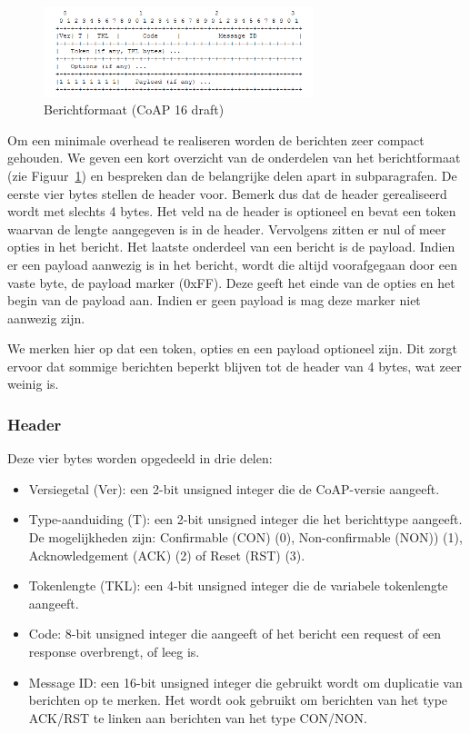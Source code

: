 \begin{figure}
\vspace{-20pt}
\includegraphics[width=0.7\textwidth]{fig/CoAPMessageFormat}
\vspace{-30pt}
\caption{Berichtformaat (CoAP 16 draft)}
\vspace{-10pt}
\label{fig:CoAPMessageFormat}
\end{figure}
Om een minimale overhead te realiseren worden de berichten zeer compact gehouden. We geven een kort overzicht van de onderdelen van het berichtformaat (zie Figuur~\ref{fig:CoAPMessageFormat}) en bespreken dan de belangrijke delen apart in subparagrafen. De eerste vier bytes stellen de header voor. Bemerk dus dat de header gerealiseerd wordt met slechts 4 bytes. Het veld na de header is optioneel en bevat een token waarvan de lengte aangegeven is in de header. Vervolgens zitten er nul of meer opties in het bericht.
Het laatste onderdeel van een bericht is de payload. Indien er een payload aanwezig is in het bericht, wordt die altijd voorafgegaan door een vaste byte, de payload marker (0xFF). Deze geeft het einde van de opties en het begin van de payload aan. Indien er geen payload is mag deze marker niet aanwezig zijn.

We merken hier op dat een token, opties en een payload optioneel zijn. Dit zorgt ervoor dat sommige berichten beperkt blijven tot de header van 4 bytes, wat zeer weinig is.

\subsubsection{Header}

Deze vier bytes worden opgedeeld in drie delen:
\begin{itemize}
\item Versiegetal (Ver): een 2-bit unsigned integer die de CoAP-versie aangeeft. 
\item Type-aanduiding (T): een 2-bit unsigned integer die het berichttype aangeeft. De mogelijkheden zijn: Confirmable (CON)  (0), Non-confirmable (NON))  (1), Acknowledgement (ACK)  (2) of Reset (RST)  (3).
\item Tokenlengte (TKL): een 4-bit unsigned integer die de variabele tokenlengte aangeeft.
\item Code: 8-bit unsigned integer die aangeeft of het bericht een request of een response overbrengt, of leeg is.
\item Message ID: een 16-bit unsigned integer die gebruikt wordt om duplicatie van berichten op te merken. Het wordt ook gebruikt om berichten van het type ACK/RST te linken aan berichten van het type CON/NON.
\end{itemize}

